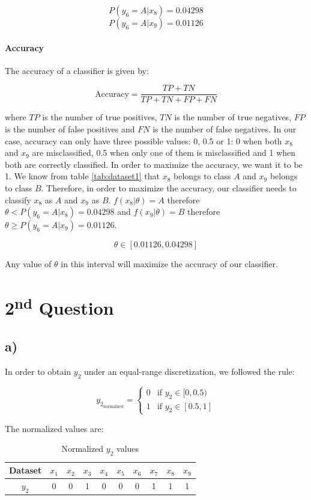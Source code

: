 \documentclass{article}
\begin{document}
\[ P(y_6 = A|x_8) = 0.04298 \]
\[ P(y_6 = A|x_9) = 0.01126 \]

\paragraph{Accuracy}

The accuracy of a classifier is given by:

\[ \text{Accuracy} = \frac{TP + TN}{TP + TN + FP + FN} \]

where $TP$ is the number of true positives, $TN$ is the number of true negatives, $FP$ is the number of false positives and $FN$ is the number of false negatives.
In our case, accuracy can only have three possible values: 0, 0.5 or 1: 0 when both $x_8$ and $x_9$ are misclassified, 0.5 when only one of them is misclassified and 1 when both are correctly classified.
In order to maximize the accuracy, we want it to be 1. We know from table \ref{tab:dataset1} that $x_8$ belongs to class $A$ and $x_9$ belongs to class $B$. Therefore, in order to maximize the accuracy, our classifier needs to classify $x_8$ as $A$ and $x_9$ as $B$.
$f(x_8|\theta) = A$ therefore $\theta < P(y_6=A|x_8) = 0.04298$ and $f(x_9|\theta) = B$ therefore $\theta \geq P(y_6=A|x_9) = 0.01126$. 

\[ \theta \in [0.01126, 0.04298] \]

Any value of $\theta$ in this interval will maximize the accuracy of our classifier.

\newpage

\section*{2\textsuperscript{nd} Question}

\subsection*{a)}

In order to obtain $y_2$ under an equal-range discretization, we followed the rule:

\[ y_{2_{\text{normalized}}} = \begin{cases}
  0 & \text{if } y_2 \in [0, 0.5) \\
  1 & \text{if } y_2 \in [0.5, 1]
\end{cases} \]

The normalized values are:

\begin{table}[H]
\centering
\begin{tabular}{|c|c|c|c|c|c|c|c|c|c|}
  \hline
  Dataset & $x_1$ & $x_2$ & $x_3$ & $x_4$ & $x_5$ & $x_6$ & $x_7$ & $x_8$ & $x_9$ \\ \hline
  $y_2$ & 0 & 0 & 1 & 0 & 0 & 0 & 1 & 1 & 1 \\ \hline
\end{tabular}
\label{tab:dataset2}
\caption{Normalized $y_2$ values}
\end{table}
\end{document}
